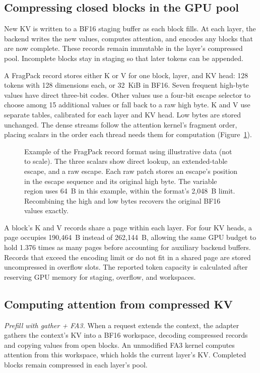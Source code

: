 \documentclass[conference]{IEEEtran}
\begin{document}
\subsection{Compressing closed blocks in the GPU pool}
New KV is written to a BF16 staging buffer as each block fills. At each
layer, the backend writes the new values, computes attention, and encodes
any blocks that are now complete. These records remain immutable in the
layer's compressed pool. Incomplete blocks stay in staging so that later
tokens can be appended.

A FragPack record stores either K or V for one block, layer, and KV head:
128 tokens with 128 dimensions each, or 32~KiB in BF16. Seven frequent
high-byte values have direct three-bit codes. Other values use a four-bit
escape selector to choose among 15 additional values or fall back to a raw
high byte. K and V use separate tables, calibrated for each layer and KV
head. Low bytes are stored unchanged. The dense streams follow the
attention kernel's fragment order, placing scalars in the order each
thread needs them for computation
(Figure~\ref{fig:record}).

\begin{figure}[t]
\centering

\caption{Example of the FragPack record format using illustrative data
(not to scale). The three scalars show direct lookup, an extended-table
escape, and a raw escape. Each raw patch stores an escape's position in
the escape sequence and its original high byte. The variable region uses
64~B in this example, within the format's 2,048~B limit. Recombining the
high and low bytes recovers the original BF16 values exactly.}
\label{fig:record}
\end{figure}

A block's K and V records share a page within each layer. For four KV heads,
a page occupies 190,464~B instead of 262,144~B, allowing the same GPU budget
to hold 1.376 times as many pages before accounting for auxiliary backend
buffers. Records that exceed the encoding limit or do not fit in a shared
page are stored uncompressed in overflow slots. The reported token capacity
is calculated after reserving GPU memory for staging, overflow, and
workspaces.

\begin{samepage}
\subsection{Computing attention from compressed KV}
\emph{Prefill with gather + FA3.} When a request extends the context, the
adapter gathers the context's KV into a BF16 workspace, decoding compressed
records and copying values from open blocks. An unmodified FA3 kernel
computes attention from this workspace, which holds the current layer's KV.
Completed blocks remain compressed in each layer's pool.

\end{samepage}
\end{document}
